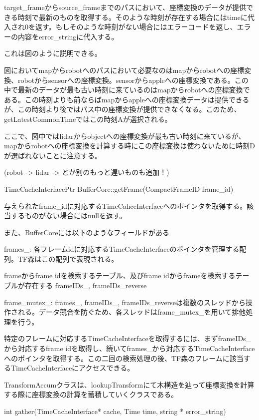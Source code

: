 \documentclass{jarticle}
\begin{document}
\begin{multicols}{2}
target\_frameからsource\_frameまでのパスにおいて、座標変換のデータが提供できる時刻で最新のものを取得する。そのような時刻が存在する場合にはtimeに代入され0を返す。もしそのような時刻がない場合にはエラーコードを返し、エラーの内容をerror\_stringに代入する。

これは図のように説明できる。

図においてmapからrobotへのパスにおいて必要なのはmapからrobotへの座標変換、robotからsensorへの座標変換。sensorからappleへの座標変換である。この中で最新のデータが最も古い時刻に来ているのはmapからrobotへの座標変換である。この時刻よりも前ならばmapからappleへの座標変換データは提供できるが、この時刻より後ではパス中の座標変換が提供できなくなる。このため、getLatestCommonTimeではこの時刻Aが選択される。

ここで、図中ではlidarからobjectへの座標変換が最も古い時刻に来ているが、mapからrobotへの座標変換を計算する時にこの座標変換は使わないために時刻Dが選ばれないことに注意する。

(robot -> lidar -> とか別のもっと遅いものも追加！)

TimeCacheInterfacePtr BufferCore::getFrame(CompactFrameID frame\_id)

与えられたframe\_idに対応するTimeCahceInterfaceへのポインタを取得する。該当するものがない場合にはnullを返す。

また、BufferCoreには以下のようなフィールドがある



frames\_: 各フレームidに対応するTimeCacheInterfaceのポインタを管理する配列。TF森はこの配列で表現される。




frameからframe idを検索するテーブル、及びframe idからframeを検索するテーブルが存在する frameIDs\_, frameIDs\_reverse

frame\_mutex\_: frames\_, frameIDs\_, frameIDs\_reverseは複数のスレッドから操作される。データ競合を防ぐため、各スレッドはframe\_mutex\_を用いて排他処理を行う。


特定のフレームに対応するTimeCacheInterfaceを取得するには、まずframeIDs\_から対応するframe idを取得し、続いてframes\_から対応するTimeCacheInterfaceへのポインタを取得する。この二回の検索処理の後、TF森のフレームに該当するTimeCacheInterfaceにアクセスできる。

TransformAccumクラスは、lookupTransformにて木構造を辿って座標変換を計算する際に座標変換の計算を蓄積していくクラスである。

int gather(TimeCacheInterface* cache, Time time, string * error\_string)


\end{multicols}
\end{document}
